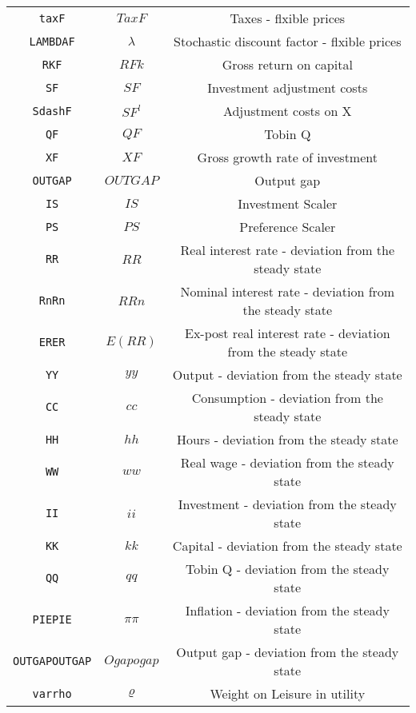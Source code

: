 \begin{center}
\begin{longtable}{ccc}
\texttt{taxF} & $TaxF$ & Taxes - flxible prices\\
\texttt{LAMBDAF} & $\lambda$ & Stochastic discount factor - flxible prices\\
\texttt{RKF} & $RFk$ & Gross return on capital\\
\texttt{SF} & $SF$ & Investment adjustment costs\\
\texttt{SdashF} & $SF^{l}$ & Adjustment costs on X\\
\texttt{QF} & $QF$ & Tobin Q\\
\texttt{XF} & $XF$ & Gross growth rate of investment\\
\texttt{OUTGAP} & $OUTGAP$ & Output gap\\
\texttt{IS} & $IS$ & Investment Scaler\\
\texttt{PS} & $PS$ & Preference Scaler\\
\texttt{RR} & $RR$ & Real interest rate - deviation from the steady state\\
\texttt{RnRn} & $RRn$ & Nominal interest rate - deviation from the steady state\\
\texttt{ERER} & $E(RR)$ & Ex-post real interest rate - deviation from the steady state\\
\texttt{YY} & $yy$ & Output - deviation from the steady state\\
\texttt{CC} & $cc$ & Consumption - deviation from the steady state\\
\texttt{HH} & $hh$ & Hours - deviation from the steady state\\
\texttt{WW} & $ww$ & Real wage - deviation from the steady state\\
\texttt{II} & $ii$ & Investment - deviation from the steady state\\
\texttt{KK} & $kk$ & Capital - deviation from the steady state\\
\texttt{QQ} & $qq$ & Tobin Q - deviation from the steady state\\
\texttt{PIEPIE} & $\pi\pi$ & Inflation - deviation from the steady state\\
\texttt{OUTGAPOUTGAP} & $Ogapogap$ & Output gap - deviation from the steady state\\
\texttt{varrho} & ${\varrho}$ & Weight on Leisure in utility\\
\hline%
\end{longtable}
\end{center}
